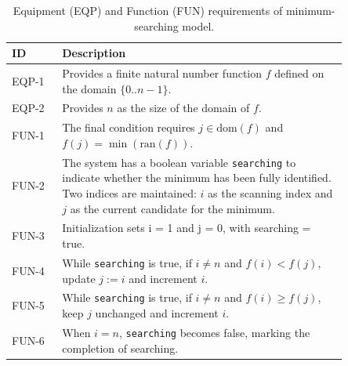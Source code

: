 \begin{table}[h!]
\centering
\footnotesize
\begin{tabular}{l p{0.85\linewidth}}
\toprule
\textbf{ID} & \textbf{Description} \\
\midrule
EQP-1 & Provides a finite natural number function $f$ defined on the domain $\{0..n-1\}$. \\
EQP-2 & Provides $n$ as the size of the domain of $f$. \\
FUN-1 & The final condition requires $j \in \text{dom}(f)$ and $f(j) = \min(\text{ran}(f))$. \\
FUN-2 & The system has a boolean variable \texttt{searching} to indicate whether the minimum has been fully identified. Two indices are maintained: $i$ as the scanning index and $j$ as the current candidate for the minimum. \\
FUN-3 & Initialization sets i = 1 and j = 0, with searching = true. \\
FUN-4 & While \texttt{searching} is true, if $i \neq n$ and $f(i) < f(j)$, update $j := i$ and increment $i$. \\
FUN-5 & While \texttt{searching} is true, if $i \neq n$ and $f(i) \geq f(j)$, keep $j$ unchanged and increment $i$. \\
FUN-6 & When $i = n$, \texttt{searching} becomes false, marking the completion of searching. \\
\bottomrule
\end{tabular}
\caption{Equipment (EQP) and Function (FUN) requirements of minimum-searching model.}
\label{tab:example}
\end{table}
